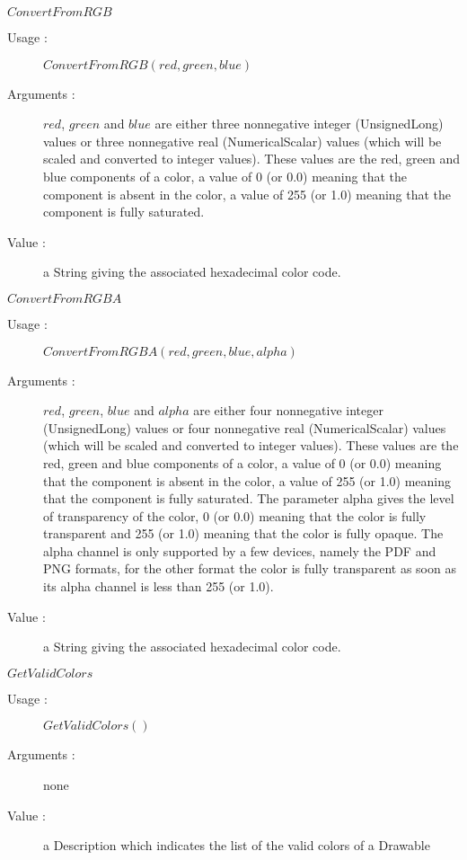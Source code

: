 \begin{description}
\begin{description}
    \bigskip
  \item $ConvertFromRGB$
    \begin{description}
    \item[Usage :] $ConvertFromRGB(red, green, blue)$
    \item[Arguments :] $red$, $green$ and $blue$ are either three nonnegative integer (UnsignedLong) values or three nonnegative real (NumericalScalar) values (which will be scaled and converted to integer values). These values are the red, green and blue components of a color, a value of 0 (or 0.0) meaning that the component is absent in the color, a value of 255 (or 1.0) meaning that the component is fully saturated.
    \item[Value :] a String giving the associated hexadecimal color code.
    \end{description}
    \bigskip
  \item $ConvertFromRGBA$
    \begin{description}
    \item[Usage :] $ConvertFromRGBA(red, green, blue, alpha)$
    \item[Arguments :] $red$, $green$, $blue$ and $alpha$ are either four nonnegative integer (UnsignedLong) values or four nonnegative real (NumericalScalar) values (which will be scaled and converted to integer values). These values are the red, green and blue components of a color, a value of 0 (or 0.0) meaning that the component is absent in the color, a value of 255 (or 1.0) meaning that the component is fully saturated. The parameter alpha gives the level of transparency of the color, 0 (or 0.0) meaning that the color is fully transparent and 255 (or 1.0) meaning that the color is fully opaque. The alpha channel is only supported by a few devices, namely the PDF and PNG formats, for the other format the color is fully transparent as soon as its alpha channel is less than 255 (or 1.0).
    \item[Value :] a String giving the associated hexadecimal color code.
    \end{description}
    \bigskip
  \item $GetValidColors$
    \begin{description}
    \item[Usage :] $GetValidColors()$
    \item[Arguments :] none
    \item[Value :] a Description which indicates the list of the valid colors of a Drawable
    \end{description}

\end{description}
\end{description}
